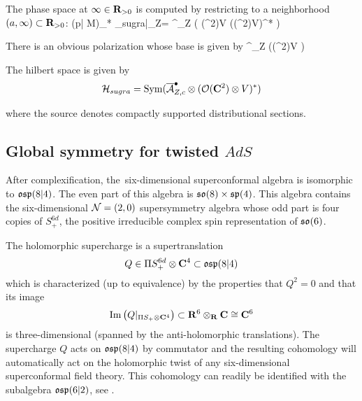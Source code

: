 The phase space at $\infty\in \mathbf{R}_{>0}$ is computed by restricting to a neighborhood $(a, \infty)\subset \mathbf{R}_{>0}$:
\beqn
(p| \mathring M)_* \cL_{sugra}|_{\infty \times Z}= \cA^\bullet_Z \otimes \left ( \cO (\C^{2})\otimes V  \Pi (\cO (\C^{2})\otimes V)^{*} \right )
\eeqn

There is an obvious polarization whose base is given by
\beqn
\cA^\bullet_Z \otimes \left (\cO (\C^{2})\otimes V \right )
\eeqn


\begin{dfn}
  The hilbert space is given by
  \[ \mathcal H_{sugra} = \operatorname{Sym} (\overline {\mathcal A}^{\bullet}_{Z, c} \otimes (\mathcal O (\mathbf{C}^{2}) \otimes V)^{*} )\]

  where the source denotes compactly supported distributional sections.
\end{dfn}

\subsection{Global symmetry for twisted $AdS$}
\label{s:global1}

After complexification, the~six-dimensional superconformal algebra is isomorphic to $\mathfrak{osp}(8|4)$.
The even part of this algebra is $\mathfrak{so}(8) \times \mathfrak{sp}(4)$.
This algebra contains the six-dimensional $\mathcal N=(2,0)$ supersymmetry algebra whose odd part is four copies of $S^{6d}_+$, the positive irreducible complex spin representation of $\mathfrak{so}(6)$.

The holomorphic supercharge is a supertranslation
\[
Q \in \Pi S^{6d}_+ \otimes \mathbf{C}^4 \subset \mathfrak{osp}(8|4)
\]
which is characterized (up to equivalence) by the properties that $Q^2 = 0$ and that its image
\[
{\rm Im}\left(Q|_{\Pi S_+ \otimes \mathbf{C}^4} \right) \subset \mathbf{R}^6 \otimes_{\mathbf{R}} \mathbf{C} \cong \mathbf{C}^6
\]
is three-dimensional (spanned by the anti-holomorphic translations). 
The supercharge $Q$ acts on $\mathfrak{osp}(8|4)$ by commutator and the resulting cohomology will automatically act on the holomorphic twist of any six-dimensional superconformal field theory. 
This cohomology can readily be identified with the subalgebra $\mathfrak{osp}(6|2)$, see \cite{SWsuco2}. 


